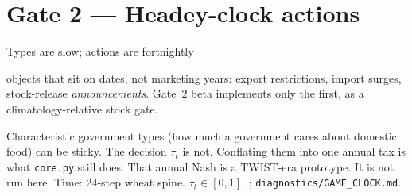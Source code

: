\section{Gate 2 --- Headey-clock actions}

\begin{frame}[label=gate2]{Types are slow; actions are fortnightly}

\citet{headey2011} objects that sit on dates, not marketing years: export
restrictions, import surges, stock-release \emph{announcements}. Gate~2
beta implements only the first, as a climatology-relative stock gate.

Characteristic government types (how much a government cares about
domestic food) can be sticky. The decision $\tau_t$ is not. Conflating
them into one annual tax is what \texttt{core.py} still does. That annual
Nash is a TWIST-era prototype. It is not run here.
{Time: 24-step wheat spine. $\tau_t\in[0,1]$.}
{\citet{headey2011}; \texttt{diagnostics/GAME\_CLOCK.md}.}
\end{frame}

